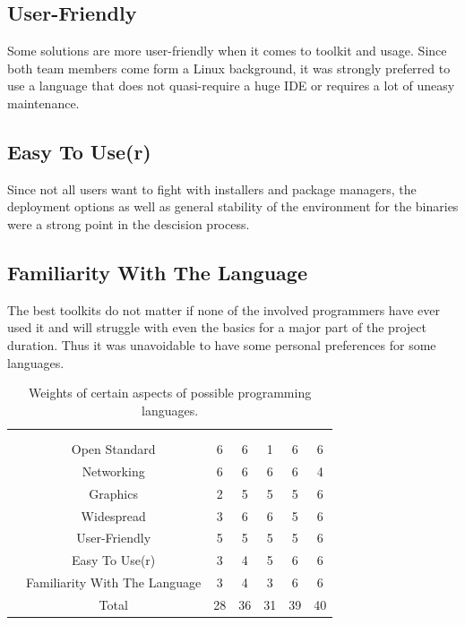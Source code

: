 \subsection*{User-Friendly} Some solutions are more user-friendly when it comes to toolkit and usage. Since both team members come form a Linux background, it was strongly preferred to use a language that does not quasi-require a huge IDE or requires a lot of uneasy maintenance.

\subsection*{Easy To Use(r)} Since not all users want to fight with installers and package managers, the deployment options as well as general stability of the environment for the binaries were a strong point in the descision process.

\subsection*{Familiarity With The Language} The best toolkits do not matter if none of the involved programmers have ever used it and will struggle with even the basics for a major part of the project duration. Thus it was unavoidable to have some personal preferences for some languages.

\begin{table}
\begin{centering}
\setlength{\extrarowheight}{2pt}
\begin{tabular}{*{7}{c|}}
    \multicolumn{2}{c}{}        & \multicolumn{2}{c}{}\\\cline{3-7}
    \multicolumn{1}{c}{}    &   & \parbox[t]{2mm}{}%
                                & \parbox[t]{2mm}{}%
                                & \parbox[t]{2mm}{}%
                                & \parbox[t]{2mm}{}%
                                & \parbox[t]{2mm}{} \\
                & Open Standard & 6 & 6 & 1 & 6 & 6\\
                   & Networking & 6 & 6 & 6 & 6 & 4\\
                     & Graphics & 2 & 5 & 5 & 5 & 6\\
                   & Widespread & 3 & 6 & 6 & 5 & 6\\
                & User-Friendly & 5 & 5 & 5 & 5 & 6\\
               & Easy To Use(r) & 3 & 4 & 5 & 6 & 6\\
& Familiarity With The Language & 3 & 4 & 3 & 6 & 6\\
                       & Total &28 &36 &31 &39 & 40\\
\end{tabular}
\caption{Weights of certain aspects of possible programming languages.}
\label{fig:gui:language_choices}
\end{centering}
\end{table}

